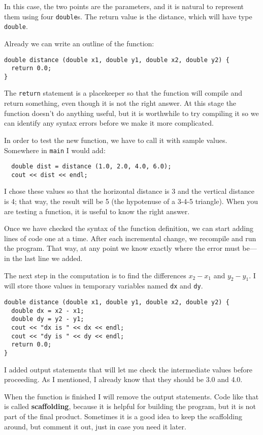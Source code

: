 In this case, the two points are the parameters, and it is natural to
represent them using four {\tt double}s.  The return value is the
distance, which will have type {\tt double}.

Already we can write an outline of the function:

\begin{verbatim}
double distance (double x1, double y1, double x2, double y2) {
  return 0.0;
}
\end{verbatim}
%
The {\tt return} statement is a placekeeper so that the function will
compile and return something, even though it is not the right answer.
At this stage the function doesn't do anything useful, but it is
worthwhile to try compiling it so we can identify any syntax errors
before we make it more complicated.

In order to test the new function, we have to call it with
sample values.  Somewhere in {\tt main} I would add:

\begin{verbatim}
  double dist = distance (1.0, 2.0, 4.0, 6.0);
  cout << dist << endl;
\end{verbatim}
%
I chose these values so that the horizontal
distance is 3 and the vertical distance is 4; that way,
the result will be 5 (the hypotenuse of a 3-4-5 triangle).
When you are testing a function, it is useful to know the right
answer.

Once we have checked the syntax of the function definition, we
can start adding lines of code one at a time.  After each
incremental change, we recompile and run the program.  That
way, at any point we know exactly where the error must be---in
the last line we added.

The next step in the computation is to find the differences
$x_2 - x_1$ and $y_2 - y_1$.  I will store those values in
temporary variables named {\tt dx} and {\tt dy}.

\begin{verbatim}
double distance (double x1, double y1, double x2, double y2) {
  double dx = x2 - x1;
  double dy = y2 - y1;
  cout << "dx is " << dx << endl;
  cout << "dy is " << dy << endl;
  return 0.0;
}
\end{verbatim}
%
I added output statements that will let me check the intermediate
values before proceeding.  As I mentioned, I already know that they
should be 3.0 and 4.0.


When the function is finished I will remove the output statements.  Code
like that is called {\bf scaffolding}, because it is helpful for
building the program, but it is not part of the final product.
Sometimes it is a good idea to keep the scaffolding around, but
comment it out, just in case you need it later.

